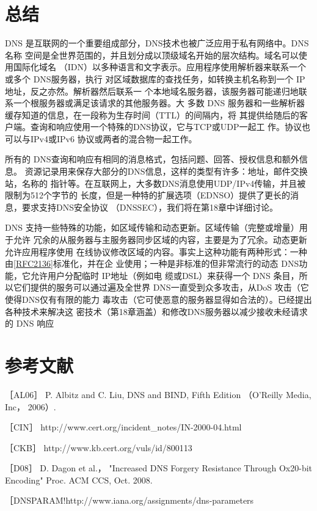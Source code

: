 \section{总结}

DNS 是互联网的一个重要组成部分，DNS技术也被广泛应用于私有网络中。DNS名称
空间是全世界范围的，并且划分成以顶级域名开始的层次结构。域名可以使用国际化域名
（IDN）以多种语言和文字表示。应用程序使用解析器来联系一个或多个 DNS服务器，执行
对区域数据库的查找任务，如转换主机名称到一个 IP 地址，反之亦然。解析器然后联系一
个本地域名服务器，该服务器可能递归地联系一个根服务器或满足该请求的其他服务器。大
多数 DNS 服务器和一些解析器缓存知道的信息，在一段称为生存时间（TTL）的间隔内，将
其提供给随后的客户端。查询和响应使用一个特殊的DNS协议，它与TCP或UDP一起工
作。协议也可以与IPv4或IPv6 协议或两者的混合物一起工作。

所有的 DNS查询和响应有相同的消息格式，包括问题、回答、授权信息和额外信息。
资源记录用来保存大部分的DNS信息，这样的类型有许多：地址，邮件交换站，名称的
指针等。在互联网上，大多数DNS消息使用UDP/IPv4传输，并且被限制为512个字节的
长度，但是一种特的扩展选项（EDNSO）提供了更长的消息，要求支持DNS安全协议
（DNSSEC），我们将在第18章中详细讨论。

DNS 支持一些特殊的功能，如区域传输和动态更新。区域传输（完整或增量）用于允许
冗余的从服务器与主服务器同步区域的内容，主要是为了冗余。动态更新允许应用程序使用
在线协议修改区域的内容。事实上这种功能有两种形式：一种由\href{https://www.rfc-editor.org/rfc/rfc2136}{[RFC2136]}标准化，并在企
业使用；一种是非标准的但非常流行的动态 DNS功能，它允许用户分配临时 IP地址（例如电
缆或DSL）来获得一个 DNS 条目，所以它们提供的服务可以通过遍及全世界
DNS一直受到众多攻击，从DoS 攻击（它使得DNS仅有有限的能力
毒攻击（它可使恶意的服务器显得如合法的）。已经提出各种技术来解决这
密技术（第18章涵盖）和修改DNS服务器以减少接收未经请求的 DNS 响应

\section{参考文献}

［AL06］ P. Albitz and C. Liu, DNS and BIND, Fifth Edition （O'Reilly Media, Inc，
2006）.

［CIN］ http://www.cert.org/incident\_notes/IN-2000-04.html

［CKB］ http://www.kb.cert.org/vuls/id/800113

［D08］ D. Dagon et al.， "Increased DNS Forgery Resistance Through Ox20-bit
Encoding" Proc. ACM CCS, Oct. 2008.

［DNSPARAM!http://www.iana.org/assignments/dns-parameters

